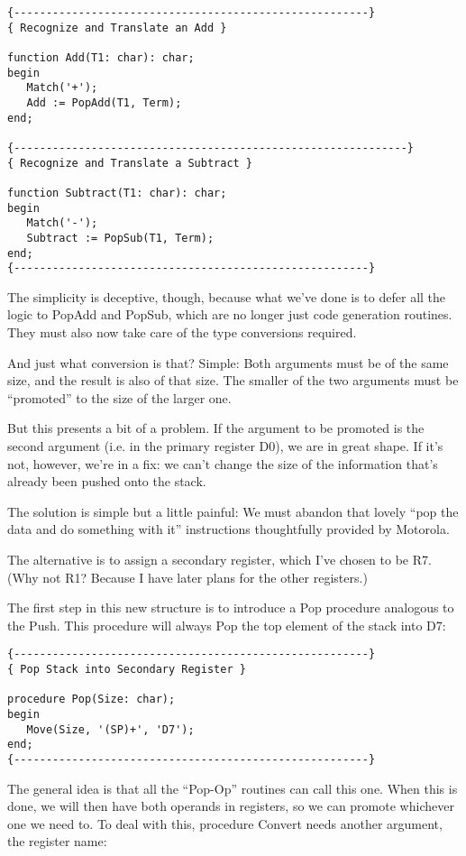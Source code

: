 \begin{verbatim}
{-------------------------------------------------------}
{ Recognize and Translate an Add }

function Add(T1: char): char;
begin
   Match('+');
   Add := PopAdd(T1, Term);
end;

{-------------------------------------------------------------}
{ Recognize and Translate a Subtract }

function Subtract(T1: char): char;
begin
   Match('-');
   Subtract := PopSub(T1, Term);
end;
{-------------------------------------------------------}
\end{verbatim}

The simplicity is  deceptive, though, because what we've done is to defer all the logic to PopAdd and PopSub, which are  no longer just code generation routines. They must also now take care of the type conversions required.

And just what conversion is that?  Simple: Both arguments must be of the same size, and the result  is  also  of  that  size. The smaller of the two arguments must be ``promoted'' to  the  size  of the larger one.

But  this  presents a bit of a problem. If the  argument  to  be promoted is the second argument  (i.e. in  the  primary register D0), we  are  in  great  shape. If it's not, however, we're in a fix: we can't change the size of the  information  that's already been pushed onto the stack.

The solution is simple but a little painful: We must abandon that lovely  ``pop  the  data and do something  with  it''  instructions thoughtfully provided by Motorola.

The alternative is to assign  a  secondary  register, which I've chosen to be R7. (Why not R1?  Because I  have  later  plans for the other registers.)

The  first  step in this new structure  is  to  introduce  a  Pop procedure analogous to the Push. This procedure will always Pop the top element of the stack into D7:

\begin{verbatim}
{-------------------------------------------------------}
{ Pop Stack into Secondary Register }

procedure Pop(Size: char);
begin
   Move(Size, '(SP)+', 'D7');
end;
{-------------------------------------------------------}
\end{verbatim}

The general idea is that all the ``Pop-Op'' routines can  call this one. When  this is done, we will then have  both  operands  in registers, so we can promote whichever  one  we need to. To deal with this, procedure Convert needs another argument, the register name:

